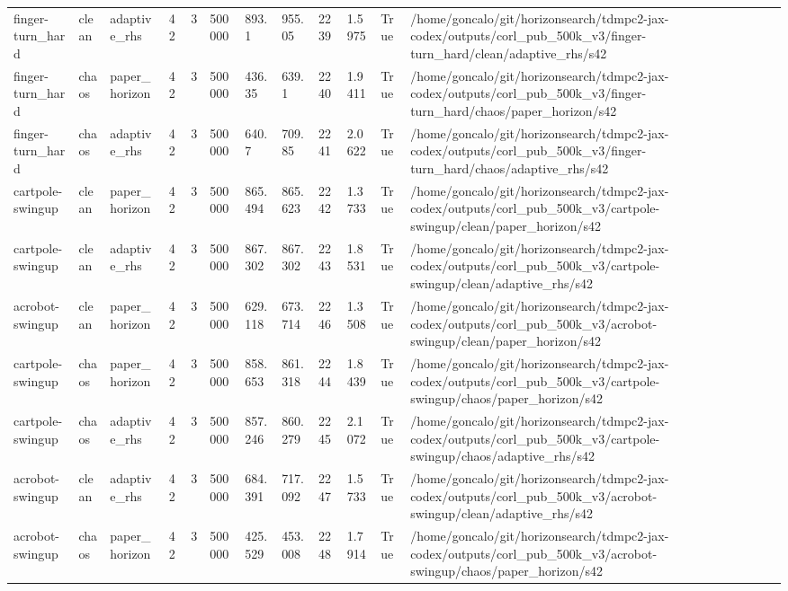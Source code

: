 \begin{tabular}{llllllllllll}
finger-turn\_hard & clean & adaptive\_rhs & 42 & 3 & 500000 & 893.1 & 955.05 & 2239 & 1.5975 & True & /home/goncalo/git/horizonsearch/tdmpc2-jax-codex/outputs/corl\_pub\_500k\_v3/finger-turn\_hard/clean/adaptive\_rhs/s42 \\
finger-turn\_hard & chaos & paper\_horizon & 42 & 3 & 500000 & 436.35 & 639.1 & 2240 & 1.9411 & True & /home/goncalo/git/horizonsearch/tdmpc2-jax-codex/outputs/corl\_pub\_500k\_v3/finger-turn\_hard/chaos/paper\_horizon/s42 \\
finger-turn\_hard & chaos & adaptive\_rhs & 42 & 3 & 500000 & 640.7 & 709.85 & 2241 & 2.0622 & True & /home/goncalo/git/horizonsearch/tdmpc2-jax-codex/outputs/corl\_pub\_500k\_v3/finger-turn\_hard/chaos/adaptive\_rhs/s42 \\
cartpole-swingup & clean & paper\_horizon & 42 & 3 & 500000 & 865.494 & 865.623 & 2242 & 1.3733 & True & /home/goncalo/git/horizonsearch/tdmpc2-jax-codex/outputs/corl\_pub\_500k\_v3/cartpole-swingup/clean/paper\_horizon/s42 \\
cartpole-swingup & clean & adaptive\_rhs & 42 & 3 & 500000 & 867.302 & 867.302 & 2243 & 1.8531 & True & /home/goncalo/git/horizonsearch/tdmpc2-jax-codex/outputs/corl\_pub\_500k\_v3/cartpole-swingup/clean/adaptive\_rhs/s42 \\
acrobot-swingup & clean & paper\_horizon & 42 & 3 & 500000 & 629.118 & 673.714 & 2246 & 1.3508 & True & /home/goncalo/git/horizonsearch/tdmpc2-jax-codex/outputs/corl\_pub\_500k\_v3/acrobot-swingup/clean/paper\_horizon/s42 \\
cartpole-swingup & chaos & paper\_horizon & 42 & 3 & 500000 & 858.653 & 861.318 & 2244 & 1.8439 & True & /home/goncalo/git/horizonsearch/tdmpc2-jax-codex/outputs/corl\_pub\_500k\_v3/cartpole-swingup/chaos/paper\_horizon/s42 \\
cartpole-swingup & chaos & adaptive\_rhs & 42 & 3 & 500000 & 857.246 & 860.279 & 2245 & 2.1072 & True & /home/goncalo/git/horizonsearch/tdmpc2-jax-codex/outputs/corl\_pub\_500k\_v3/cartpole-swingup/chaos/adaptive\_rhs/s42 \\
acrobot-swingup & clean & adaptive\_rhs & 42 & 3 & 500000 & 684.391 & 717.092 & 2247 & 1.5733 & True & /home/goncalo/git/horizonsearch/tdmpc2-jax-codex/outputs/corl\_pub\_500k\_v3/acrobot-swingup/clean/adaptive\_rhs/s42 \\
acrobot-swingup & chaos & paper\_horizon & 42 & 3 & 500000 & 425.529 & 453.008 & 2248 & 1.7914 & True & /home/goncalo/git/horizonsearch/tdmpc2-jax-codex/outputs/corl\_pub\_500k\_v3/acrobot-swingup/chaos/paper\_horizon/s42 \\

\end{tabular}
